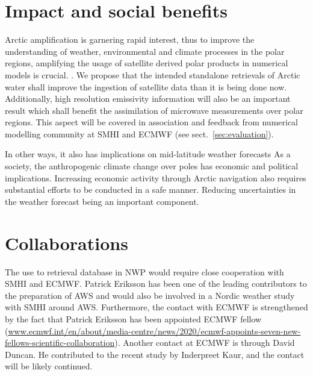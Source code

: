 \documentclass[12pt,oneside,a4paper]{article}
\begin{document}
\section{Impact and social benefits}
%
\label{sec:impact}
Arctic amplification is garnering rapid interest, thus to improve the understanding of weather, environmental and climate processes in the polar regions, amplifying the usage of satellite derived polar products in numerical models is crucial. . We propose that the intended standalone retrievals of Arctic water shall improve the ingestion of satellite data than it is being done now. Additionally, high resolution emissivity information will also be an important result which shall benefit the assimilation of microwave measurements over polar regions. This aspect will be covered in association and feedback from numerical modelling community at SMHI and ECMWF (see sect.~\ref{sec:evaluation}).


In other ways, it also has implications on mid-latitude weather forecasts
As a society, the anthropogenic climate change over poles has economic and political implications. Increasing economic activity through Arctic navigation also requires substantial efforts to be conducted in a safe manner. Reducing uncertainties in the weather forecast being an important component. 

\section{Collaborations}
%
The use to retrieval database in NWP would require close cooperation with SMHI and ECMWF. Patrick Eriksson has been one of the leading contributors to the preparation of AWS and would also be involved in a Nordic weather study with SMHI around AWS. Furthermore, the contact with ECMWF is strengthened by the fact that Patrick Eriksson has been appointed ECMWF  fellow ({\footnotesize \url{www.ecmwf.int/en/about/media-centre/news/2020/ecmwf-appoints-seven-new-fellows-scientific-collaboration}}). Another contact at ECMWF is through David Duncan. He contributed to the recent study by Inderpreet Kaur, and the contact will be likely continued. 
\end{document}
